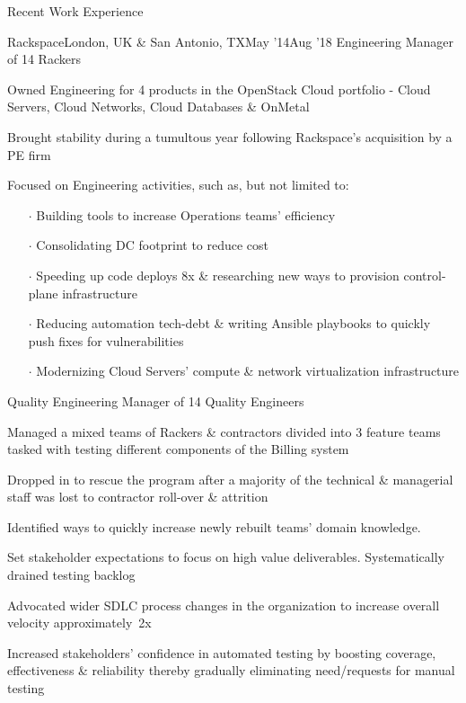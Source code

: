 \documentclass{resume} %
\begin{document}
\begin{rSection}{Recent Work Experience}
\begin{rSubsection}{Rackspace}{London, UK \& San Antonio, TX}{May '14}{Aug '18}
  {Engineering Manager of 14 Rackers}
  \item Owned Engineering for 4 products in the OpenStack Cloud portfolio - Cloud Servers, Cloud Networks, Cloud Databases \& OnMetal
  \item Brought stability during a tumultous year following Rackspace's acquisition by a PE firm
  \item Focused on Engineering activities, such as, but not limited to:
    \vspace{-0.5em}
    \begin{itemize}  \itemsep0.5pt \parskip0pt
    \item[$\cdot$] Building tools to increase Operations teams' efficiency
    \item[$\cdot$] Consolidating DC footprint to reduce cost
    \item[$\cdot$] Speeding up code deploys 8x \& researching new ways to provision control-plane infrastructure
    \item[$\cdot$] Reducing automation tech-debt \& writing Ansible playbooks to quickly push fixes for vulnerabilities
    \item[$\cdot$] Modernizing Cloud Servers' compute \& network virtualization infrastructure
    \end{itemize}
\end{rSubsection}\vspace{-1em}

  
\begin{rSubsection}{}{}{}{}
{Quality Engineering Manager of 14 Quality Engineers}
  \item Managed a mixed teams of Rackers \& contractors divided into 3 feature teams tasked with testing different components of the Billing system
\item Dropped in to rescue the program after a majority of the technical \& managerial staff was lost to contractor roll-over \& attrition
\item Identified ways to quickly increase newly rebuilt teams' domain knowledge. %
\item Set stakeholder expectations to focus on high value deliverables. Systematically drained testing backlog
\item Advocated wider SDLC process changes in the organization to increase overall velocity approximately~2x
\item Increased stakeholders' confidence in automated testing by boosting coverage, effectiveness \& reliability thereby gradually eliminating need/requests for manual testing
  

\end{rSubsection}
\end{rSection}
\end{document}
